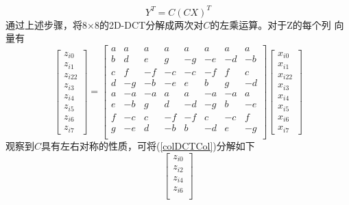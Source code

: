 \documentclass{article}
\numberwithin {equation}{section}
\begin{document}
\begin{spacing}{1.25}
\begin{equation}
          Y^{T}=C(CX)^{T} 
          \label{rowColDCT}
        \end{equation}
        通过上述步骤，将8×8的2D-DCT分解成两次对$C$的左乘运算。对于Z的每个列
        向量有
        \begin{equation}
          \begin{bmatrix}
            z_{i0}\\z_{i1}\\z_{i22}\\z_{i3}\\z_{i4}\\z_{i5}\\z_{i6}\\z_{i7}
          \end{bmatrix}=\begin{bmatrix}
            a & a   & a   & a   & a   & a   & a   & a\\
            b & d   & e   & g   & -g  & -e  & -d  & -b\\
            c & f   & -f  & -c  & -c  & -f  & f   & c\\
            d & -g  & -b  & -e  & e   & b   & g   & -d\\
            a & -a  & -a  & a   & a   & -a  & -a  & a\\
            e & -b  & g   & d   & -d  & -g  & b   & -e\\
            f & -c  & c   & -f  & -f  & c   & -c  & f\\
            g & -e  & d   & -b  & b   & -d  & e   & -g\\
          \end{bmatrix}\begin{bmatrix}
            x_{i0}\\x_{i1}\\x_{i22}\\x_{i3}\\x_{i4}\\x_{i5}\\x_{i6}\\x_{i7}
          \end{bmatrix}
          \label{colDCTCol}
        \end{equation}
        观察到$C$具有左右对称的性质，可将(\ref{colDCTCol})分解如下
        \begin{equation}
          \begin{bmatrix}
            z_{i0}\\z_{i2}\\z_{i4}\\z_{i6}\\

\end{bmatrix}
\end{equation}
\end{spacing}
\end{document}

